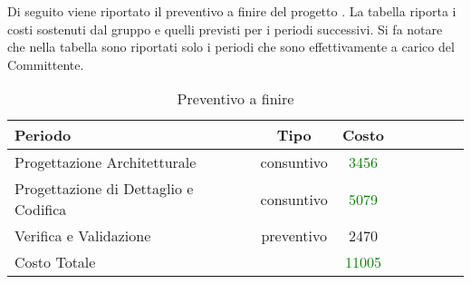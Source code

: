 Di seguito viene riportato il preventivo a finire del progetto \PROGETTO{}. La tabella riporta i costi sostenuti dal gruppo e quelli previsti per i periodi successivi. Si fa notare che nella tabella sono riportati solo i periodi che sono effettivamente a carico del Committente.

\begin{table}[h]
	\centering
	\begin{tabular}{|l|c|c|c|c|c|c|c|}
		\toprule
		\textbf{Periodo} & \textbf{Tipo} & \textbf{Costo} \\
		
		\midrule
		Progettazione Architetturale & consuntivo & \textcolor{green}{3456} \\
		Progettazione di Dettaglio e Codifica & consuntivo & \textcolor{green}{5079} \\ 
		Verifica e Validazione & preventivo & 2470 \\
		
		\midrule
		Costo Totale & & \textcolor{green}{11005} \\
				
		\bottomrule
	\end{tabular}
	\caption{Preventivo a finire}
\end{table}

